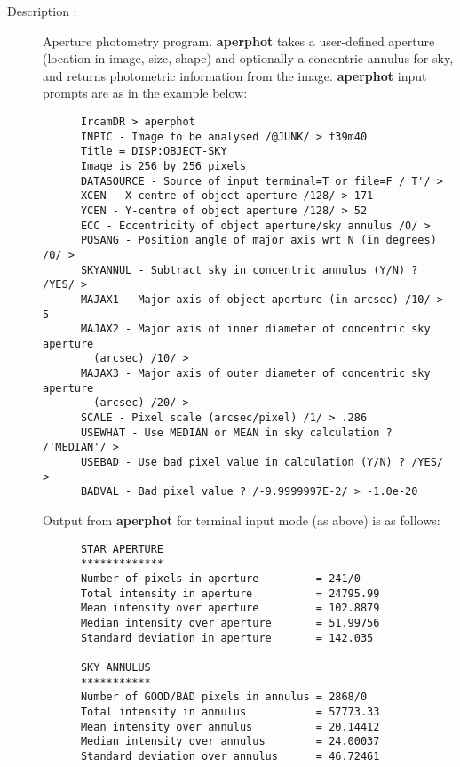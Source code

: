 \begin{description}

\item[Description :] Aperture photometry program.  {\bf aperphot} takes a
user-defined aperture (location in image, size, shape) and optionally a
concentric annulus for sky, and returns photometric information from
the image.  {\bf aperphot} input prompts are as in the example below:

\begin{small}
\begin{verbatim}
      IrcamDR > aperphot
      INPIC - Image to be analysed /@JUNK/ > f39m40
      Title = DISP:OBJECT-SKY
      Image is 256 by 256 pixels
      DATASOURCE - Source of input terminal=T or file=F /'T'/ > 
      XCEN - X-centre of object aperture /128/ > 171
      YCEN - Y-centre of object aperture /128/ > 52
      ECC - Eccentricity of object aperture/sky annulus /0/ > 
      POSANG - Position angle of major axis wrt N (in degrees) /0/ > 
      SKYANNUL - Subtract sky in concentric annulus (Y/N) ? /YES/ > 
      MAJAX1 - Major axis of object aperture (in arcsec) /10/ > 5
      MAJAX2 - Major axis of inner diameter of concentric sky aperture 
        (arcsec) /10/ > 
      MAJAX3 - Major axis of outer diameter of concentric sky aperture 
        (arcsec) /20/ > 
      SCALE - Pixel scale (arcsec/pixel) /1/ > .286
      USEWHAT - Use MEDIAN or MEAN in sky calculation ? /'MEDIAN'/ > 
      USEBAD - Use bad pixel value in calculation (Y/N) ? /YES/ > 
      BADVAL - Bad pixel value ? /-9.9999997E-2/ > -1.0e-20
\end{verbatim}
\end{small}

Output from {\bf aperphot} for terminal input mode (as above) is as follows:

\begin{small}
\begin{verbatim}
      STAR APERTURE
      *************
      Number of pixels in aperture         = 241/0
      Total intensity in aperture          = 24795.99
      Mean intensity over aperture         = 102.8879
      Median intensity over aperture       = 51.99756
      Standard deviation in aperture       = 142.035
 
      SKY ANNULUS
      ***********
      Number of GOOD/BAD pixels in annulus = 2868/0
      Total intensity in annulus           = 57773.33
      Mean intensity over annulus          = 20.14412
      Median intensity over annulus        = 24.00037
      Standard deviation over annulus      = 46.72461
 

\end{verbatim}
\end{small}
\end{description}

